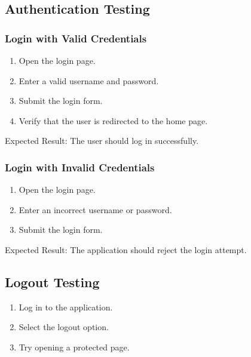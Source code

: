 \documentclass[letterpaper,10pt,english]{sphinxmanual}
\begin{document}
\subsection{Authentication Testing}
\label{\detokenize{testing:authentication-testing}}

\subsubsection{Login with Valid Credentials}
\label{\detokenize{testing:login-with-valid-credentials}}\begin{enumerate}
%
\item {} 
\sphinxAtStartPar
Open the login page.

\item {} 
\sphinxAtStartPar
Enter a valid username and password.

\item {} 
\sphinxAtStartPar
Submit the login form.

\item {} 
\sphinxAtStartPar
Verify that the user is redirected to the home page.

\end{enumerate}

\sphinxAtStartPar
Expected Result: The user should log in successfully.


\subsubsection{Login with Invalid Credentials}
\label{\detokenize{testing:login-with-invalid-credentials}}\begin{enumerate}
%
\item {} 
\sphinxAtStartPar
Open the login page.

\item {} 
\sphinxAtStartPar
Enter an incorrect username or password.

\item {} 
\sphinxAtStartPar
Submit the login form.

\end{enumerate}

\sphinxAtStartPar
Expected Result: The application should reject the login attempt.


\subsection{Logout Testing}
\label{\detokenize{testing:logout-testing}}\begin{enumerate}
%
\item {} 
\sphinxAtStartPar
Log in to the application.

\item {} 
\sphinxAtStartPar
Select the logout option.

\item {} 
\sphinxAtStartPar
Try opening a protected page.

\end{enumerate}
\end{document}
